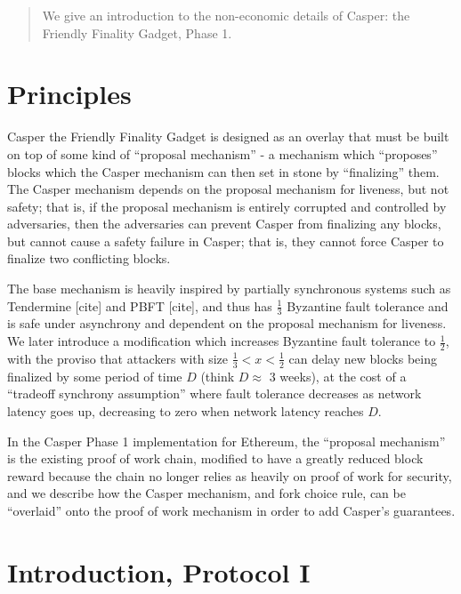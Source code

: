 \documentclass[12pt]{article}
\begin{document}
\maketitle
\begin{abstract}
We give an introduction to the non-economic details of Casper: the Friendly Finality Gadget, Phase 1.
\end{abstract}

\section{Principles}
Casper the Friendly Finality Gadget is designed as an overlay that must be built on top of some kind of ``proposal mechanism'' - a mechanism which ``proposes'' blocks which the Casper mechanism can then set in stone by ``finalizing'' them. The Casper mechanism depends on the proposal mechanism for liveness, but not safety; that is, if the proposal mechanism is entirely corrupted and controlled by adversaries, then the adversaries can prevent Casper from finalizing any blocks, but cannot cause a safety failure in Casper; that is, they cannot force Casper to finalize two conflicting blocks.

The base mechanism is heavily inspired by partially synchronous systems such as Tendermine [cite] and PBFT [cite], and thus has $\frac{1}{3}$ Byzantine fault tolerance and is safe under asynchrony and dependent on the proposal mechanism for liveness. We later introduce a modification which increases Byzantine fault tolerance to $\frac{1}{2}$, with the proviso that attackers with size $\frac{1}{3} < x < \frac{1}{2}$ can delay new blocks being finalized by some period of time $D$ (think $D \approx$ 3 weeks), at the cost of a ``tradeoff synchrony assumption'' where fault tolerance decreases as network latency goes up, decreasing to zero when network latency reaches $D$.

In the Casper Phase 1 implementation for Ethereum, the ``proposal mechanism'' is the existing proof of work chain, modified to have a greatly reduced block reward because the chain no longer relies as heavily on proof of work for security, and we describe how the Casper mechanism, and fork choice rule, can be ``overlaid'' onto the proof of work mechanism in order to add Casper's guarantees.

\section{Introduction, Protocol I}
\end{document}
